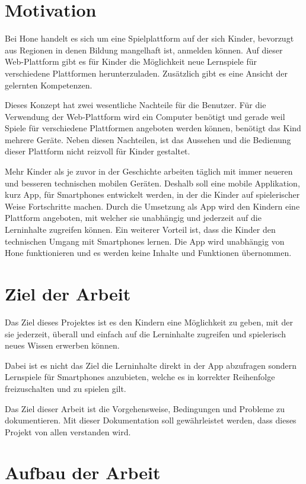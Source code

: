 \section{Motivation}
Bei Hone handelt es sich um eine Spielplattform auf der sich Kinder, bevorzugt aus Regionen in denen Bildung mangelhaft ist, anmelden können. Auf dieser Web-Plattform gibt es für Kinder die Möglichkeit neue Lernspiele für verschiedene Plattformen herunterzuladen. Zusätzlich gibt es eine Ansicht der gelernten Kompetenzen. 

Dieses Konzept hat zwei wesentliche Nachteile für die Benutzer. Für die Verwendung der Web-Plattform wird ein Computer benötigt und gerade weil Spiele für verschiedene Plattformen angeboten werden können, benötigt das Kind mehrere Geräte. Neben diesen Nachteilen, ist das Aussehen und die Bedienung dieser Plattform nicht reizvoll für Kinder gestaltet.

Mehr Kinder als je zuvor in der Geschichte arbeiten täglich mit immer neueren und besseren technischen mobilen Geräten. Deshalb soll eine mobile Applikation, kurz App, für Smartphones entwickelt werden, in der die Kinder auf spielerischer Weise Fortschritte machen. Durch die Umsetzung als App wird den Kindern eine Plattform angeboten, mit welcher sie unabhängig und jederzeit auf die Lerninhalte zugreifen können. Ein weiterer Vorteil ist, dass die Kinder den technischen Umgang mit Smartphones lernen. Die App wird unabhängig von Hone funktionieren und es werden keine Inhalte und Funktionen übernommen.

\section{Ziel der Arbeit}

Das Ziel dieses Projektes ist es den Kindern eine Möglichkeit zu geben, mit der sie jederzeit, überall und einfach auf die Lerninhalte zugreifen und spielerisch neues Wissen erwerben können.

Dabei ist es nicht das Ziel die Lerninhalte direkt in der App abzufragen sondern Lernspiele für Smartphones anzubieten, welche es in korrekter Reihenfolge freizuschalten und zu spielen gilt.

Das Ziel dieser Arbeit ist die Vorgehensweise, Bedingungen und Probleme zu dokumentieren. Mit dieser Dokumentation soll gewährleistet werden, dass dieses Projekt von allen verstanden wird.

\section{Aufbau der Arbeit}

